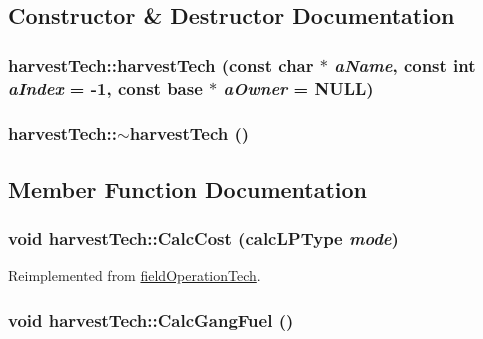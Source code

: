 \subsection{Constructor \& Destructor Documentation}
\hypertarget{classharvest_tech_a219b924c7e1e1224f72f62eebc973d4c}{
\subsubsection[{harvestTech}]{\setlength{\rightskip}{0pt plus 5cm}harvestTech::harvestTech (const char $\ast$ {\em aName}, \/  const int {\em aIndex} = {\ttfamily -\/1}, \/  const {\bf base} $\ast$ {\em aOwner} = {\ttfamily NULL})}}
\label{classharvest_tech_a219b924c7e1e1224f72f62eebc973d4c}
\hypertarget{classharvest_tech_a37b6681330c9b3d7edd5480f8c68cd66}{
\subsubsection[{$\sim$harvestTech}]{\setlength{\rightskip}{0pt plus 5cm}harvestTech::$\sim$harvestTech ()}}
\label{classharvest_tech_a37b6681330c9b3d7edd5480f8c68cd66}


\subsection{Member Function Documentation}
\hypertarget{classharvest_tech_a9cbac27e3242c6ac08e0cbcebfdb13b3}{
\subsubsection[{CalcCost}]{\setlength{\rightskip}{0pt plus 5cm}void harvestTech::CalcCost ({\bf calcLPType} {\em mode})}}
\label{classharvest_tech_a9cbac27e3242c6ac08e0cbcebfdb13b3}


Reimplemented from \hyperlink{classfield_operation_tech_a908e81a53479de1a6768d58964dbc57c}{fieldOperationTech}.\hypertarget{classharvest_tech_a7da76cf91a1af094816d27b373e7f913}{
\subsubsection[{CalcGangFuel}]{\setlength{\rightskip}{0pt plus 5cm}void harvestTech::CalcGangFuel ()}}
\label{classharvest_tech_a7da76cf91a1af094816d27b373e7f913}


